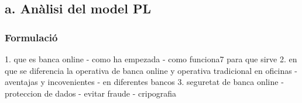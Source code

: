 \subsection*{a. Anàlisi del model PL}
\subsubsection*{Formulació}




1. que es banca online
    - como  ha empezada
    - como funciona7 para que sirve
2. en que se diferencia la operativa de banca online y operativa tradicional en oficinas
    - aventajas y incovenientes
    - en diferentes bancos
3. seguretat de banca online
    - proteccion de dados
    - evitar fraude
    - cripografia
